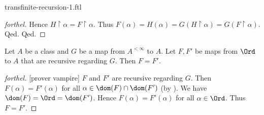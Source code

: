 \documentclass{naproche-library}
\begin{document}
\begin{smodule}[title=Transfinite Recursion I]{transfinite-recursion-1.ftl}
\begin{proof}[forthel]
      Hence $H \restriction \alpha = F \restriction \alpha$.
      Thus $F(\alpha)
        = H(\alpha)
        = G(H \restriction \alpha)
        = G(F \restriction \alpha)$.
    Qed.
  Qed.
\end{proof}

\begin{theorem}[forthel,title=Transfinite Recursion Theorem: Uniqueness,id=transfinite-recursion_uniqueness]
  Let $A$ be a class and $G$ be a map from $A^{< \infty}$ to $A$.
  Let $F, F'$ be maps from $\Ord$ to $A$ that are recursive regarding $G$.
  Then $F = F'$.
\end{theorem}
\begin{proof}[forthel]
  [prover vampire]
  $F$ and $F'$ are recursive regarding $G$.
  Then $F(\alpha) = F'(\alpha)$ for all $\alpha \in \dom(F) \cap \dom(F')$ (by ).
  We have $\dom(F) = \Ord = \dom(F')$.
  Hence $F(\alpha) = F'(\alpha)$ for all $\alpha \in \Ord$.
  Thus $F = F'$.
\end{proof}
\end{smodule}
\end{document}
